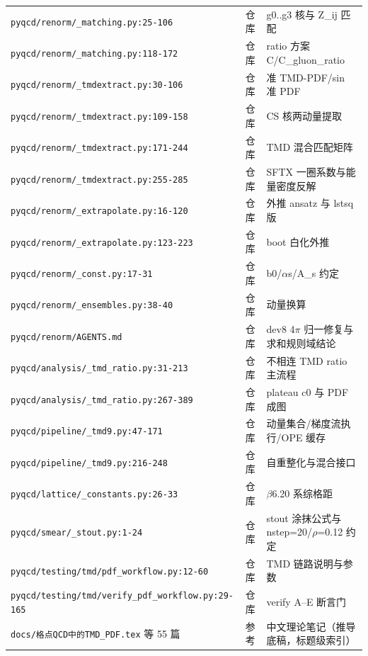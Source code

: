 \documentclass[UTF8]{ctexart}
\begin{document}
\begin{xltabular}{\textwidth}{XlX}
\texttt{\nolinkurl{pyqcd/renorm/_matching.py:25-106}} & 仓库 & g0..g3 核与 Z\_ij 匹配 \\
\texttt{\nolinkurl{pyqcd/renorm/_matching.py:118-172}} & 仓库 & ratio 方案 C/C\_gluon\_ratio \\
\texttt{\nolinkurl{pyqcd/renorm/_tmdextract.py:30-106}} & 仓库 & 准 TMD-PDF/sin 准 PDF \\
\texttt{\nolinkurl{pyqcd/renorm/_tmdextract.py:109-158}} & 仓库 & CS 核两动量提取 \\
\texttt{\nolinkurl{pyqcd/renorm/_tmdextract.py:171-244}} & 仓库 & TMD 混合匹配矩阵 \\
\texttt{\nolinkurl{pyqcd/renorm/_tmdextract.py:255-285}} & 仓库 & SFTX 一圈系数与能量密度反解 \\
\texttt{\nolinkurl{pyqcd/renorm/_extrapolate.py:16-120}} & 仓库 & 外推 ansatz 与 lstsq 版 \\
\texttt{\nolinkurl{pyqcd/renorm/_extrapolate.py:123-223}} & 仓库 & boot 白化外推 \\
\texttt{\nolinkurl{pyqcd/renorm/_const.py:17-31}} & 仓库 & b0/$\alpha$s/A\_s 约定 \\
\texttt{\nolinkurl{pyqcd/renorm/_ensembles.py:38-40}} & 仓库 & 动量换算 \\
\texttt{\nolinkurl{pyqcd/renorm/AGENTS.md}} & 仓库 & dev8 4$\pi$ 归一修复与求和规则域结论 \\
\texttt{\nolinkurl{pyqcd/analysis/_tmd_ratio.py:31-213}} & 仓库 & 不相连 TMD ratio 主流程 \\
\texttt{\nolinkurl{pyqcd/analysis/_tmd_ratio.py:267-389}} & 仓库 & plateau c0 与 PDF 成图 \\
\texttt{\nolinkurl{pyqcd/pipeline/_tmd9.py:47-171}} & 仓库 & 动量集合/梯度流执行/OPE 缓存 \\
\texttt{\nolinkurl{pyqcd/pipeline/_tmd9.py:216-248}} & 仓库 & 自重整化与混合接口 \\
\texttt{\nolinkurl{pyqcd/lattice/_constants.py:26-33}} & 仓库 & $\beta$6.20 系综格距 \\
\texttt{\nolinkurl{pyqcd/smear/_stout.py:1-24}} & 仓库 & stout 涂抹公式与 nstep=20/$\rho$=0.12 约定 \\
\texttt{\nolinkurl{pyqcd/testing/tmd/pdf_workflow.py:12-60}} & 仓库 & TMD 链路说明与参数 \\
\texttt{\nolinkurl{pyqcd/testing/tmd/verify_pdf_workflow.py:29-165}} & 仓库 & verify A--E 断言门 \\
\texttt{docs/格点QCD中的TMD\_PDF.tex} 等 55 篇 & 参考 & 中文理论笔记（推导底稿，标题级索引） \\

\end{xltabular}
\end{document}
